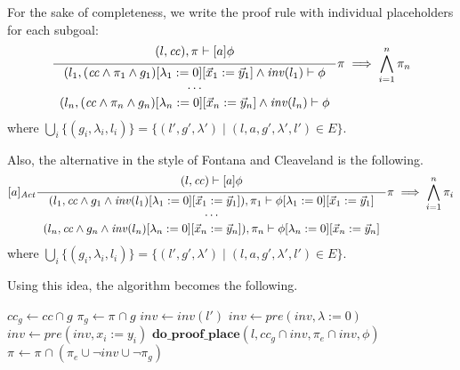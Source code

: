 \documentclass{article}
\newcommand{\proofrule}[3][]{#1 \frac{\raisebox{.7ex}{\normalsize{$#2$}}}
  {\raisebox{-1.0ex}{\normalsize{$#3$}}}}
\newcommand{\placeholder}[1][]{\pi_{#1}}
\newcommand{\loc}{l}
\newcommand{\region}{\mathit{cc}}
\newcommand{\inv}{\mathit{inv}}
\newcommand{\var}[1]{\ensuremath{\mathit{#1}}}
\newcommand{\method}[1]{\ensuremath{\mathbf{#1}}}
\begin{document}
For the sake of completeness, we write the proof rule with individual placeholders for each subgoal:
\[
\proofrule
{(\loc, \region), \placeholder \vdash [a] \phi}
{\begin{array}{c}
(\loc_1, (\region \land \placeholder[1] \land g_1)[\lambda_1 := 0][\vec{x}_1 := \vec{y}_1] \land \inv(\loc_1) \vdash \phi \\
\cdots \\
(\loc_n, (\region \land \placeholder[n] \land g_n)[\lambda_n := 0][\vec{x}_n := \vec{y}_n] \land \inv(\loc_n) \vdash \phi
\end{array}
}
\placeholder \implies \bigwedge_{i=1}^n \placeholder[n]
\]
where $\bigcup_i \{ (g_i,\lambda_i,\loc_i) \} = \{ (\loc', g', \lambda') \mid (\loc, a, g', \lambda', \loc') \in E \}$.

Also, the alternative in the style of Fontana and Cleaveland is the following.
\[
\proofrule[{[a]_{\mathit{Act}}}]
{(\loc, \region) \vdash [a]\phi}
{
\begin{array}{c}
 (\loc_1, \region \land g_1 \land \inv(\loc_1)[\lambda_1 := 0][\vec{x}_1 := \vec{y}_1]), \placeholder[1] \vdash \phi{[\lambda_1 := 0][\vec{x}_1 := \vec{y}_1]} \\
\cdots \\
(\loc_n, \region \land g_n \land \inv(\loc_n)[\lambda_n := 0][\vec{x}_n := \vec{y}_n]), \placeholder[n] \vdash \phi{[\lambda_n := 0][\vec{x}_n := \vec{y}_n]}
\end{array}
}
\placeholder \implies \bigwedge_{i=1}^n \placeholder[i]
\]
where $\bigcup_i \{ (g_i,\lambda_i,\loc_i) \} = \{ (\loc', g', \lambda') \mid (\loc, a, g', \lambda', \loc') \in E \}$.

Using this idea, the algorithm becomes the following.

\begin{algorithm}[H]
  \caption{$\method{do\_proof\_place\_allact}(\loc, \region, \placeholder, [-]\phi$}
  \begin{algorithmic}
  \FOR{$(\loc, a, g, \lambda, \loc') \in E$}
    \STATE $\region_g \gets \region \cap g$
    \STATE $\placeholder[g] \gets \placeholder \cap g$    
    \IF{$\region_g \neq \emptyset \land \placeholder[g] \neq \emptyset$}
      \STATE $\var{inv} \gets \inv(\loc')$
      \IF{$\inv(\loc') \neq \emptyset$}
        \STATE $\var{inv} \gets \mathit{pre}(\var{inv}, \lambda := 0)$
          \STATE $\var{inv} \gets \mathit{pre}(\var{inv}, x_i := y_i)$
        \ENDFOR
      \ENDIF
      \STATE $\method{do\_proof\_place}(\loc, \region_g \cap \var{inv}, \placeholder[e] \cap \var{inv}, \phi)$
      \STATE $\placeholder \gets \placeholder \cap (\placeholder[e] \cup \lnot \var{inv} \cup \lnot \placeholder[g])$
    \ENDIF
  \ENDFOR
  \end{algorithmic}
  \end{algorithm}
\end{document}

